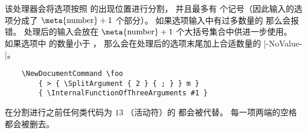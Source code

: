 \documentclass{l3doc}
\begin{document}
%
\begin{function}[updated = 2012-02-12]{\SplitArgument}
\begin{syntax}
      
\end{syntax}
该处理器会将选项按照  的出现位置进行分割，
并且最多有  个记号（因此输入的选项分成了  $\text{\meta{number}} + 1$ 个部分）。
如果选项输入中有过多数量的  那么会报错。
处理后的输入会放在 $\text{\meta{number}} + 1$ 个大括号集合中供进一步使用。
如果选项中  的数量小于 ，
那么会在处理后的选项末尾加上合适数量的 |-NoValue-|。
\begin{verbatim}
    \NewDocumentCommand \foo
        { > { \SplitArgument { 2 } { ; } } m }
        { \InternalFunctionOfThreeArguments #1 }
\end{verbatim}
在分割进行之前任何类代码为 $13$ （活动符）的  都会被代替。
每一项两端的空格都会被删去。
\end{function}
\end{document}
